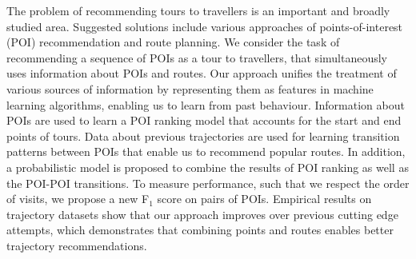 The problem of recommending tours to travellers is an important and broadly studied area.
Suggested solutions include various approaches of points-of-interest (POI) 
recommendation and route planning.
We consider the task of recommending a sequence of POIs as a tour
to travellers, that simultaneously uses information about POIs and routes.
Our approach unifies the treatment of various sources of information
by representing them as features in machine learning algorithms, enabling us to
learn from past behaviour. %
Information about POIs are used to learn a POI ranking model
that accounts for the start and end points of tours.
Data about previous trajectories are used for learning transition patterns between POIs that
enable us to recommend popular routes.
In addition, a probabilistic model is proposed 
to combine the results of POI ranking as well as the POI-POI transitions.
To measure performance, such that we respect the order of visits, we propose
a new F$_1$ score on pairs of POIs.
Empirical results on trajectory datasets show that our approach improves over 
previous cutting edge attempts, which demonstrates that
combining points and routes enables better trajectory recommendations.
